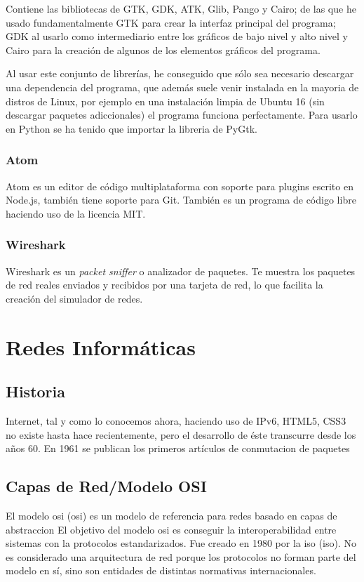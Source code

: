 \documentclass[a4paper, 11pt]{report} %
\newcommand{\acr}[1]{\acrshort{#1} (\acrlong{#1})}
\begin{document}
Contiene las bibliotecas de GTK, GDK, ATK, Glib, Pango y Cairo; de las que he usado fundamentalmente GTK para crear la interfaz principal del programa; GDK al usarlo como intermediario entre los gráficos de bajo nivel y alto nivel y Cairo para la creación de algunos de los elementos gráficos del programa.

Al usar este conjunto de librerías, he conseguido que sólo sea necesario descargar una dependencia del programa, que además suele venir instalada en la mayoria de distros de Linux, por ejemplo en una instalación limpia de Ubuntu 16 (sin descargar paquetes adiccionales) el programa funciona perfectamente. Para usarlo en Python se ha tenido que importar la libreria de PyGtk.
\subsection{Atom}
Atom es un editor de código multiplataforma con soporte para plugins escrito en Node.js, también tiene soporte para Git. También es un programa de código libre haciendo uso de la licencia MIT.

\subsection{Wireshark}
Wireshark es un \textit{packet sniffer} o analizador de paquetes. Te muestra los paquetes de red reales enviados y recibidos por una tarjeta de red, lo que facilita la creación del simulador de redes.

\chapter{Redes Informáticas}
\section*{Historia}
Internet, tal y como lo conocemos ahora, haciendo uso de IPv6, HTML5, CSS3 no existe hasta hace recientemente, pero el desarrollo de éste transcurre desde los años 60. En 1961 se publican los primeros artículos de \gls{conmutacion de paquetes}
\section{Capas de Red/Modelo OSI}
El modelo \acr{osi} es un modelo de referencia para redes basado en \gls{capas de abstraccion}
El objetivo del modelo \gls{osi} es conseguir la interoperabilidad entre sistemas con la protocolos estandarizados. Fue creado en 1980 por la \acr{iso}. No es considerado una arquitectura de red porque los protocolos no forman parte del modelo en sí, sino son entidades de distintas normativas internacionales.
\vspace{1pt}
\end{document}
